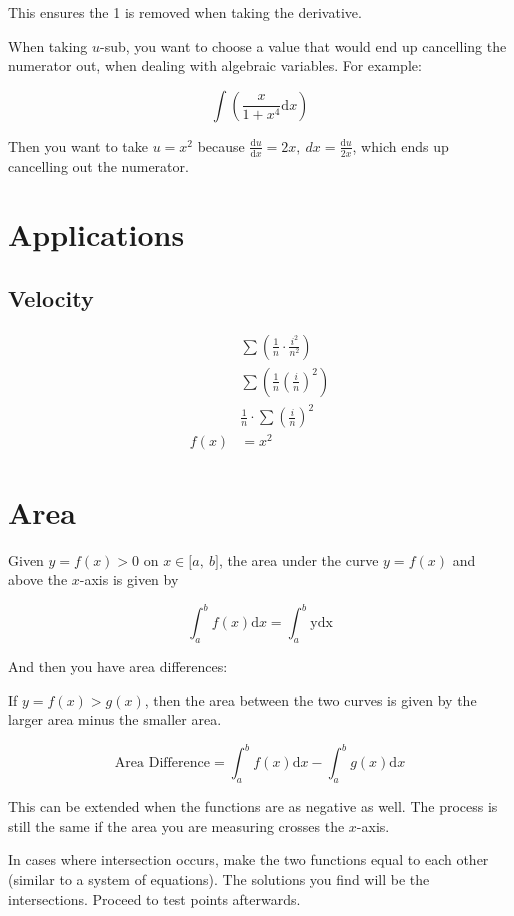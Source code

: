 \documentclass[12pt]{article}
\theoremstyle{plain}
\theoremstyle{remark}
\theoremstyle{definition}
\begin{document}
This ensures the 1 is removed when taking the derivative.

When taking \(u\)-sub, you want to choose a value that would end up
cancelling the numerator out, when dealing with algebraic variables. For
example:

\[\int\left( \frac{x}{1 + x^{4}}\text{d}x \right)\]

Then you want to take \(u = x^{2}\) because
\(\frac{\text{d}u}{\text{d}x} = 2x,\ dx = \frac{\text{d}u}{2x}\), which
ends up cancelling out the numerator.


\section{Applications}


\subsection{Velocity}

\begin{align*}
&\sum\left( \frac{1}{n} \cdot \frac{i^{2}}{n^{2}} \right) \\
&\sum\left( \frac{1}{n}\left( \frac{i}{n} \right)^{2} \right) \\
&\frac{1}{n} \cdot \sum\left( \frac{i}{n} \right)^{2} \\
f(x) &= x^{2}
\end{align*}



\section{Area}

Given \(y = f(x) > 0\) on \(x \in \lbrack a,\ b\rbrack\), the area under
the curve \(y = f(x)\) and above the \(x\)-axis is given by

\[\int_{a}^{b}{f(x)\text{d}x} = \int_{a}^{b}\text{ydx}\]

And then you have area differences:

If \(y = f(x) > g(x)\), then the area between the two curves is given by
the larger area minus the smaller area.

\[\text{Area\ Difference} = \int_{a}^{b}{f(x)\text{d}x} - \int_{a}^{b}{g(x)\text{d}x}\]

This can be extended when the functions are as negative as well. The
process is still the same if the area you are measuring crosses the
\(x\)-axis.

In cases where intersection occurs, make the two functions equal to each
other (similar to a system of equations). The solutions you find will be
the intersections. Proceed to test points afterwards.
\end{document}
